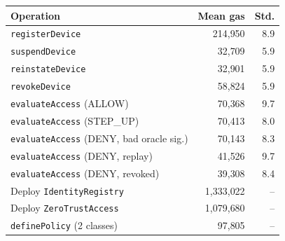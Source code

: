 \begin{tabular}{@{}lrr@{}}
\toprule
\textbf{Operation} & \textbf{Mean gas} & \textbf{Std.} \\
\midrule
\texttt{registerDevice} & 214{,}950 & 8.9 \\
\texttt{suspendDevice} & 32{,}709 & 5.9 \\
\texttt{reinstateDevice} & 32{,}901 & 5.9 \\
\texttt{revokeDevice} & 58{,}824 & 5.9 \\
\texttt{evaluateAccess} (ALLOW) & 70{,}368 & 9.7 \\
\texttt{evaluateAccess} (STEP\_UP) & 70{,}413 & 8.0 \\
\texttt{evaluateAccess} (DENY, bad oracle sig.) & 70{,}143 & 8.3 \\
\texttt{evaluateAccess} (DENY, replay) & 41{,}526 & 9.7 \\
\texttt{evaluateAccess} (DENY, revoked) & 39{,}308 & 8.4 \\
\midrule
Deploy \texttt{IdentityRegistry} & 1{,}333{,}022 & -- \\
Deploy \texttt{ZeroTrustAccess} & 1{,}079{,}680 & -- \\
\texttt{definePolicy} (2 classes) & 97{,}805 & -- \\
\bottomrule
\end{tabular}